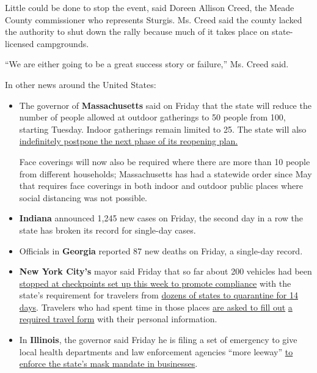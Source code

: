 Little could be done to stop the event, said Doreen Allison Creed, the
Meade County commissioner who represents Sturgis. Ms. Creed said the
county lacked the authority to shut down the rally because much of it
takes place on state-licensed campgrounds.

``We are either going to be a great success story or failure,'' Ms.
Creed said.

In other news around the United States:

\begin{itemize}
\item
  The governor of \textbf{Massachusetts} said on Friday that the state
  will reduce the number of people allowed at outdoor gatherings to 50
  people from 100, starting Tuesday. Indoor gatherings remain limited to
  25. The state will also
  \href{https://www.youtube.com/watch?v=kCGEj58c2hM\&feature=youtu.be}{indefinitely
  postpone the next phase of its reopening plan.}

  Face coverings will now also be required where there are more than 10
  people from different households; Massachusetts has had a statewide
  order since May that requires face coverings in both indoor and
  outdoor public places where social distancing was not possible.
\item
  \textbf{Indiana} announced 1,245 new cases on Friday, the second day
  in a row the state has broken its record for single-day cases.
\item
  Officials in \textbf{Georgia} reported 87 new deaths on Friday, a
  single-day record.
\item
  \textbf{New York City's} mayor said Friday that so far about 200
  vehicles had been
  \href{https://www.nytimes3xbfgragh.onion/2020/08/05/nyregion/nyc-coronavirus-quarantine-checkpoints.html}{stopped
  at checkpoints set up this week to promote compliance} with the
  state's requirement for travelers from
  \href{https://coronavirus.health.ny.gov/covid-19-travel-advisory}{dozens
  of states to quarantine for 14 days}. Travelers who had spent time in
  those places
  \href{https://www1.nyc.gov/assets/counseltothemayor/downloads/Checkpoint-FAQs.pdf}{are
  asked to fill out}
  \href{https://forms.ny.gov/s3/Welcome-to-New-York-State-Traveler-Health-Form}{a
  required travel form} with their personal information.
\item
  In \textbf{Illinois}, the governor said Friday he is filing a set of
  emergency to give local health departments and law enforcement
  agencies ``more leeway''
  \href{https://www2.illinois.gov/IISNews/21906-Gov._Pritzker_Announces_Efforts_to_Protect_Illinois_Communities.pdf}{to
  enforce the state's mask mandate in businesses}.
\end{itemize}

